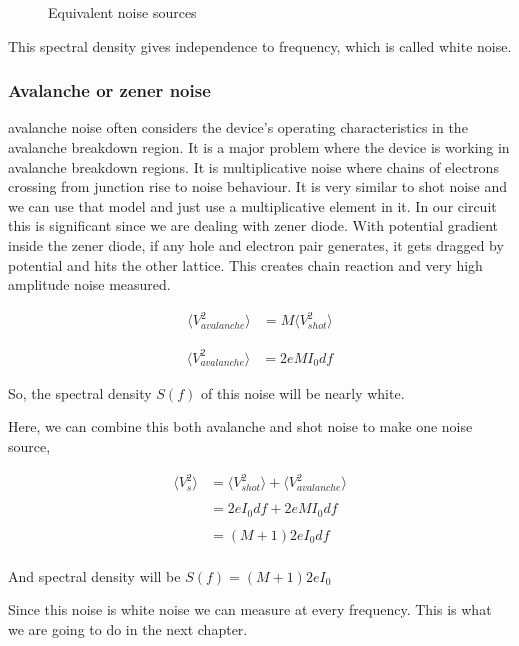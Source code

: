 \documentclass[draft,12pt]{article}
\begin{document}
\begin{figure}[hbt!]
\caption{Equivalent noise sources}
\end{figure}

This spectral density gives independence to frequency, which is called white noise. 


\subsubsection{Avalanche or zener noise \label{than}}

avalanche noise often considers the device's operating characteristics in the avalanche breakdown region. It is a major problem where the device is working in avalanche breakdown regions. It is multiplicative noise where chains of electrons crossing from junction rise to noise behaviour. It is very similar to shot noise and we can use that model and just use a multiplicative element in it. In our circuit this is significant since we are dealing with zener diode. With potential gradient inside the zener diode, if any hole and electron pair generates, it gets dragged by potential and hits the other lattice. This creates chain reaction and very high amplitude noise measured.


\begin{align*}
\langle V_{avalanche}^2\rangle & = M \langle V_{shot}^2\rangle
\end{align*}

\begin{align}\label{thavvo}
\langle V_{avalanche}^2\rangle & = 2 e M I_0 df
\end{align}

So, the spectral density $S(f)$ of this noise will be nearly white.
 
Here, we can combine this both avalanche and shot noise to make one noise source,

\begin{align*}
\langle V_{s}^2\rangle & = \langle V_{shot}^2\rangle+\langle V_{avalanche}^2\rangle\\
\\
& = 2 e I_0 df + 2 e M I_0 df\\
\\
& = (M+1) 2 e I_0 df\\
\end{align*}

And spectral density will be $S(f) = (M+1) 2 e I_0$

Since this noise is white noise we can measure at every frequency. This is what we are going to do in the next chapter. 
\end{document}
